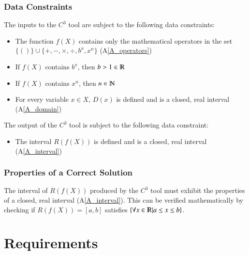 \documentclass[12pt]{article}
\newcommand{\aref}[1]{A\ref{#1}}
\newcommand{\prognameAbbrv}{$C^{3}$}
\begin{document}


\subsubsection{Data Constraints} \label{sec_DataConstraints}  
The inputs to the \prognameAbbrv{} tool are subject to the following data 
constraints:

\begin{itemize}
	\item The function $f(X)$ contains only the mathematical operators in 
	the set $\{()\} \cup \{+, -, \times, \div, b^x, x^n \}$ (\aref{A_operators})
	\item If $f(X)$ contains $b^x$, then $b > 1 \in \varmathbb{R}$
	\item If $f(X)$ contains $x^n$, then $n \in \varmathbb{N}$
	\item For every variable $x \in X$, $D(x)$ is defined and is a closed, real 
	interval (\aref{A_domain})
\end{itemize}

\noindent
The output of the \prognameAbbrv{} tool is subject to the following data 
constraint:

\begin{itemize}
	\item The interval $R(f(X))$ is defined and is a closed, real interval 
	(\aref{A_interval})
\end{itemize}

\subsubsection{Properties of a Correct Solution} 
\label{sec_CorrectSolution}

\noindent
The interval of $R(f(X))$ produced by the \prognameAbbrv{} tool must exhibit 
the properties of a closed, real interval (\aref{A_interval}). This can be 
verified mathematically by checking if $R(f(X)) = [a,b]$ satisfies $\{\forall x 
\in \varmathbb{R} | a \leq x \leq b\}$.


\section{Requirements}
\label{requirements}
\end{document}
